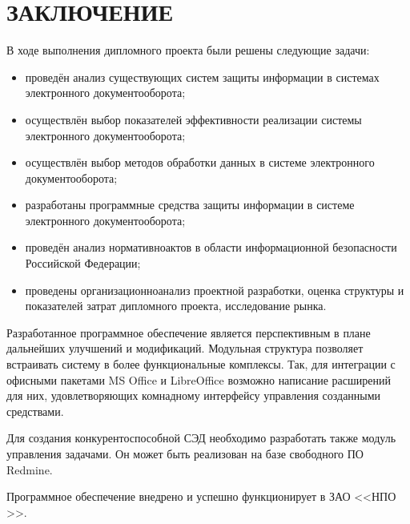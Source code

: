 \chapter*{ЗАКЛЮЧЕНИЕ}						%

В ходе выполнения дипломного проекта были решены следующие задачи:
\begin{itemize}
	\item проведён анализ существующих систем защиты информации в системах электронного документооборота;
	\item осуществлён выбор показателей эффективности реализации системы электронного документооборота;
	\item осуществлён выбор методов обработки данных в системе электронного документооборота;
	\item разработаны программные средства защиты информации в системе электронного документооборота;
	\item проведён анализ нормативно актов в области информационной безопасности Российской Федерации;
	\item проведены организационно анализ проектной разработки, оценка структуры и показателей затрат дипломного проекта, исследование рынка.
\end{itemize}

\vspace{\baselineskip}
Разработанное программное обеспечение является перспективным в плане дальнейших улучшений и модификаций. Модульная структура позволяет встраивать систему в более функциональные комплексы. Так, для интеграции с офисными пакетами MS Office и LibreOffice возможно написание расширений для них, удовлетворяющих комнадному интерфейсу управления созданными средствами.

Для создания конкурентоспособной СЭД необходимо разработать также модуль управления задачами. Он может быть реализован на базе свободного ПО Redmine.

\vspace{\baselineskip}
Программное обеспечение внедрено и успешно функционирует в ЗАО <<НПО \grqq>>.

\clearpage
